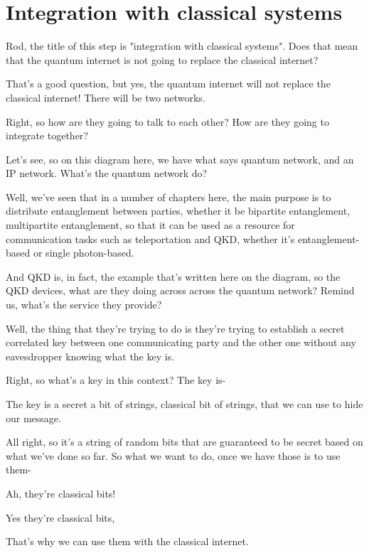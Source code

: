 \section{Integration with classical systems}
\label{sec:classical-integration}


\mmm Rod, the title of this step is "integration with classical systems". Does that mean that the quantum internet is not going to replace the classical internet?

\rrr That's a good question, but yes, the quantum internet will not replace the classical internet! There will be two networks.

\mmm Right, so how are they going to talk to each other? How are they going to integrate together?

\rrr Let's see, so on this diagram here, we have what says quantum network, and an IP network. What's the quantum network do?

\mmm Well, we've seen that in a number of chapters here, the main purpose is to distribute entanglement between parties, whether it be bipartite entanglement, multipartite entanglement, so that it can be used as a resource for communication tasks such as teleportation and QKD, whether it's entanglement-based or single photon-based.

\rrr And QKD is, in fact, the example that's written here on the diagram, so the QKD devices, what are they doing across across the quantum network? Remind us, what's the service they provide?

\mmm Well, the thing that they're trying to do is they're trying to establish a secret correlated key between one communicating party and the other one without any eavesdropper knowing what the key is.

\rrr Right, so what's a key in this context? The key is-

\mmm The key is a secret a bit of strings, classical bit of strings, that we can use to hide our message.

\rrr All right, so it's a string of random bits that are guaranteed to be secret based on what we've done so far. So what we want to do, once we have those is to use them-

\mmm Ah, they're classical bits!

\rrr Yes they're classical bits,



\mmm That's why we can use them with the classical internet.

